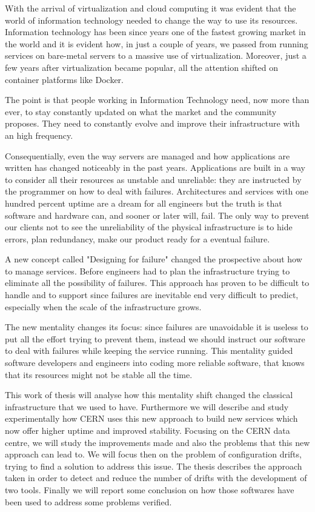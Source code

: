 
With the arrival of virtualization and cloud computing it was evident that
the world of information technology needed to change the way to use its
resources. Information technology has been since years one of the fastest
growing market in the world and it is evident how, in just a couple of
years, we passed from running services on bare-metal servers to a massive
use of virtualization. Moreover, just a few years after virtualization
became popular, all the attention shifted on container platforms like
Docker.

The point is that people working in Information Technology need, now more than
ever, to stay constantly updated on what the market and the community proposes. They need to constantly evolve and improve their infrastructure with an high
frequency.

Consequentially, even the way servers are managed and how applications are
written has changed noticeably in the past years. Applications are built
in a way to consider all their resources as unstable and unreliable: they
are instructed by the programmer on how to deal with failures.
Architectures and services with one hundred percent uptime are a dream for
all engineers but the truth is that software and hardware can, and sooner
or later will, fail. The only way to prevent our clients not to see the
unreliability of the physical infrastructure is to hide errors, plan
redundancy, make our product ready for a eventual failure.

A new concept called "Designing for failure" changed the prospective about
how to manage services. Before engineers had to plan the infrastructure
trying to eliminate all the possibility of failures. This approach has
proven to be difficult to handle and to support since failures are
inevitable end very difficult to predict, especially when the scale of the
infrastructure grows.

The new mentality changes its focus: since failures are unavoidable it is
useless to put all the effort trying to prevent them, instead we should
instruct our software to deal with failures while keeping the service
running. This mentality guided software developers and engineers into
coding more reliable software, that knows that its resources might not be
stable all the time.

This work of thesis will analyse how this mentality shift changed the
classical infrastructure that we used to have. Furthermore we will
describe and study experimentally how CERN uses this new approach to build
new services which now offer higher uptime and improved stability.
Focusing on the CERN data centre, we will study the improvements made and
also the problems that this new approach can lead to. We will focus then
on the problem of configuration drifts, trying to find a solution to
address this issue. The thesis describes the approach taken in order to
detect and reduce the number of drifts with the development of two tools.
Finally we will report some conclusion on how those softwares have been
used to address some problems verified.

